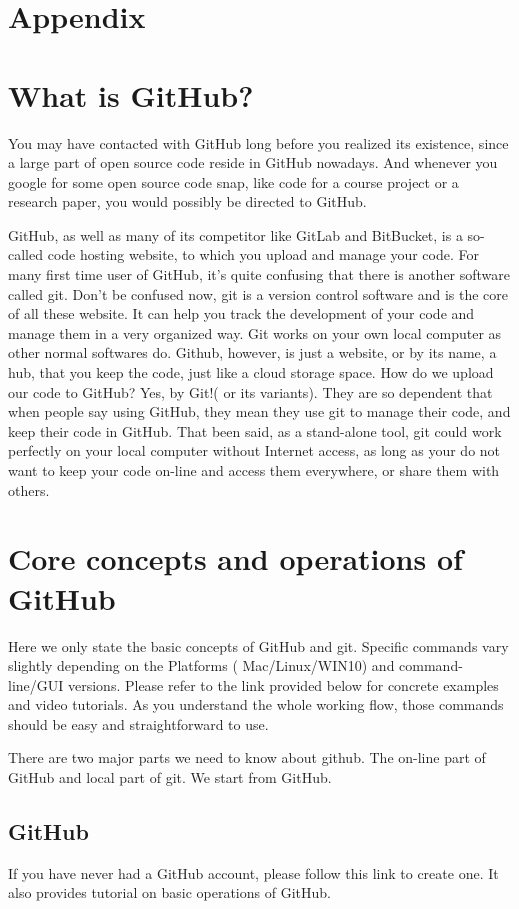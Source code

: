 \documentclass[12pt, fullpage,letterpaper]{article}
\begin{document}
\section*{Appendix}
\section*{What is GitHub?}
You may have contacted with GitHub long before you realized its existence, since a large part of open source code reside in GitHub nowadays. And whenever you google for some open source code snap, like code for a course project or a research paper, you would possibly be directed to GitHub. 

GitHub, as well as  many of its competitor like GitLab and BitBucket, is a so-called code hosting website, to which you upload and manage your code. For many first time user of GitHub, it's quite confusing that there is another software called git. Don't be confused now, git is a version control software and is the core of all these website. It can help you track the development of your code and manage them in a very organized way. Git works on your own local computer as other normal softwares do. Github, however, is just a website, or by its name, a hub, that you keep the code, just like a cloud storage space. How do we upload our code to GitHub? Yes, by Git!( or its variants). They are so dependent that when people say using GitHub, they mean they use git to manage their code, and keep their code in GitHub. That been said, as a stand-alone tool, git could  work perfectly on your local computer without Internet access, as long as your do not want to keep your code on-line and access them everywhere, or share them with others. 



\section*{Core concepts and operations of GitHub}
Here we only state the basic concepts of GitHub and git. Specific commands vary slightly depending on the Platforms ( Mac/Linux/WIN10) and command-line/GUI versions. Please refer to the link provided below for concrete examples and video tutorials. As you understand the whole working flow, those commands should be easy and straightforward to use. 

There are two major parts we need to know about github. The on-line part of GitHub and local part of git. We start from GitHub.

\subsection*{GitHub}
If you have never had a GitHub account, please follow this link to create one. It also provides tutorial on basic operations of GitHub.
\end{document}
